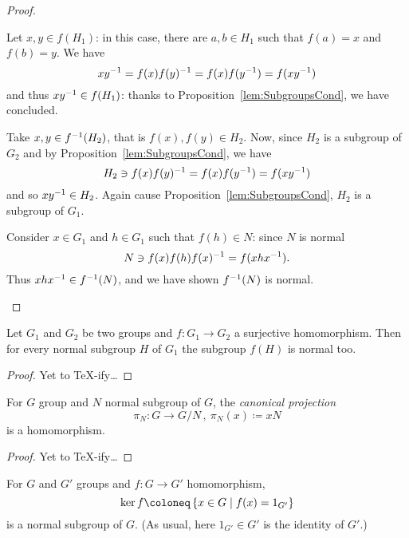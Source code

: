 \begin{proof}
\begin{tcbenum}
\item Let \(x, y \in f(H_1)\): in this case, there are \(a, b \in H_1\) such that \(f(a) = x\) and \(f(b) = y\). We have
\[x y^{-1} = f(x) f(y)^{-1} = f(x) f(y^{-1}) = f(x y^{-1})\]
and thus \(x y^{-1} \in f(H_1)\): thanks to Proposition~\ref{lem:SubgroupsCond}, we have concluded.

\item Take \(x, y \in f^{-1}(H_2)\), that is \(f(x), f(y) \in H_2\). Now, since \(H_2\) is a subgroup of \(G_2\) and by Proposition~\ref{lem:SubgroupsCond}, we have
\[H_2 \owns f(x) f(y)^{-1} = f(x)f(y^{-1}) = f(x y^{-1})\]
and so \(x y^{-1} \in H_2\). Again cause Proposition~\ref{lem:SubgroupsCond}, \(H_2\) is a subgroup of \(G_1\).

\item Consider \(x \in G_1\) and \(h \in G_1\) such that \(f(h) \in N\): since \(N\) is normal
\[N \owns f(x) f(h) f(x)^{-1} = f(x h x^{-1}).\]
Thus \(x h x^{-1} \in f^{-1}(N)\), and we have shown \(f^{-1}(N)\) is normal.\qedhere
\end{tcbenum}
\end{proof}

\begin{proposition}\label{prop:SurjectivityNormality}
Let \(G_1\) and \(G_2\) be two groups and \(f : G_1 \to G_2\) a surjective homomorphism. Then for every normal subgroup \(H\) of \(G_1\) the subgroup \(f(H)\) is normal too.
\end{proposition}

\begin{proof}
Yet to \TeX{}-ify\dots{}
\end{proof}

\begin{proposition}
For \(G\) group and \(N\) normal subgroup of \(G\), the {\em canonical projection}
\[\pi_N : G \to G/N\,, \ \pi_N(x) \coloneq xN\]
is a homomorphism.
\end{proposition}

\begin{proof}
Yet to \TeX{}-ify\dots{}
\end{proof}

\begin{proposition}
For \(G\) and \(G'\) groups and \(f : G \to G'\) homomorphism,
\[\ker f \coloneq \set{x \in G \mid f(x) = 1_{G'}}\]
is a normal subgroup of \(G\). (As usual, here \(1_{G'} \in G'\) is the identity of \(G'\).)
\end{proposition}

